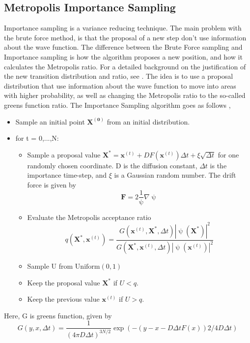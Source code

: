 \subsection{Metropolis Importance Sampling}
Importance sampling is a variance reducing technique. 
The main problem with the brute force method, is that the proposal of a new step don't use information about the wave function. 
The difference between the Brute Force sampling and Importance sampling is how the algorithm proposes a new position, and how it calculates the Metropolis ratio. For a detailed background on the justification of the new transition distribution and ratio, see \cite{mhj_book}. The idea is to use a proposal distribution that use information about the wave function to move into areas with higher probability, as well as changing the Metropolis ratio to the so-called greens function ratio.  The Importance Sampling algorithm goes as follows \cite{mhj_vmc},
\begin{itemize}
    \item Sample an initial point $\boldsymbol{X^{(0)}}$ from an initial distribution. 
    \item for t = 0,...,N:
    \begin{itemize}
        \item Sample a proposal value $\boldsymbol{X^*} = \boldsymbol{x}^{(t)} + DF(\boldsymbol{x}^{(t)})\Delta t + \xi \sqrt{\Delta t}$ for one randomly chosen coordinate. D is the diffusion constant, $\Delta t$ is the importance time-step, and $\xi$ is a Gaussian random number. The drift force is given by
        \begin{equation}
            \boldsymbol{F} = 2\frac{1}{\uppsi}\nabla\uppsi
        \end{equation}
        \item Evaluate the Metropolis acceptance ratio 
        \begin{equation}
            q(\boldsymbol{X}^*, \boldsymbol{x}^{(t)}) = \frac{G(\boldsymbol{x}^{(t)}, \boldsymbol{X}^*, \Delta t) |\uppsi(\boldsymbol{X}^*)|^2 }{ G(\boldsymbol{X}^*, \boldsymbol{x}^{(t)}, \Delta t) |\uppsi(\boldsymbol{x}^{(t)})|^2 }
        \end{equation}
        \item Sample U from $\text{Uniform}(0,1)$
        \item Keep the proposal value $\boldsymbol{X}^*$ if $U < q$.
        \item Keep the previous value $\boldsymbol{x}^{(t)}$ if $U > q$.    \end{itemize}
\end{itemize}
Here, G is greens function, given by
\begin{equation}
    G(y,x,\Delta t) = \frac{1}{(4\pi D \Delta t)^{3N/2}}\exp{(-(y - x - D\Delta t F(x))2/4D\Delta t)}
\end{equation}

